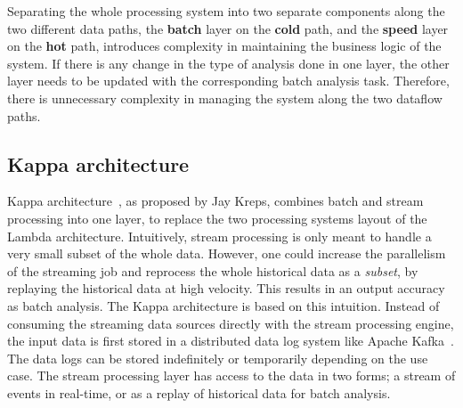 Separating the whole processing system into two separate components along 
the two different data paths, the \textbf{batch} layer on the \textbf{cold} path, and 
the \textbf{speed} layer on the \textbf{hot} path, introduces complexity in maintaining the business logic of the system.
If 
there is any change in the type of analysis done in one layer, the other layer needs to be updated 
with the corresponding batch analysis task. Therefore, there is unnecessary complexity in managing 
the system along the two dataflow paths. 
    

\subsection{Kappa architecture}%
\label{sub:Kappa architecture}
Kappa architecture~\cite{kappa_architecture}, as proposed by Jay Kreps, 
combines batch and stream processing into one layer, to replace the 
two processing systems layout of the Lambda architecture. Intuitively, stream processing is 
only meant to handle a very small subset of the whole data. However,
one could increase the parallelism of the streaming 
job and reprocess the whole historical data as a \emph{subset}, by replaying 
the historical data at high velocity. This results in an output accuracy as 
batch analysis. The Kappa architecture is based on this intuition.   
Instead of consuming the streaming data sources directly with the stream processing engine, 
the input data is first stored in a distributed data log system like Apache Kafka~\cite{kafka}. The data 
logs can be stored indefinitely or temporarily depending on the use case.
The stream processing layer has access to the data in two forms; 
a stream of events in real-time, or as a replay of historical data for batch analysis. 

